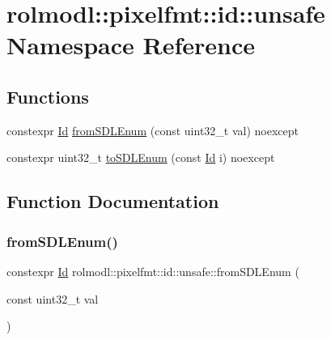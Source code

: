 \hypertarget{namespacerolmodl_1_1pixelfmt_1_1id_1_1unsafe}{}\section{rolmodl\+::pixelfmt\+::id\+::unsafe Namespace Reference}
\label{namespacerolmodl_1_1pixelfmt_1_1id_1_1unsafe}
\subsection*{Functions}
\begin{DoxyCompactItemize}
\item 
constexpr \mbox{\hyperlink{namespacerolmodl_1_1pixelfmt_a96282713e4465ba9211c8fd3a702b52b}{Id}} \mbox{\hyperlink{namespacerolmodl_1_1pixelfmt_1_1id_1_1unsafe_ac815d2437f3f0eeaaf34b8e7a179a593}{from\+S\+D\+L\+Enum}} (const uint32\+\_\+t val) noexcept
\item 
constexpr uint32\+\_\+t \mbox{\hyperlink{namespacerolmodl_1_1pixelfmt_1_1id_1_1unsafe_a0e2c2fca9f1bc5d345511929b84cc97d}{to\+S\+D\+L\+Enum}} (const \mbox{\hyperlink{namespacerolmodl_1_1pixelfmt_a96282713e4465ba9211c8fd3a702b52b}{Id}} i) noexcept
\end{DoxyCompactItemize}


\subsection{Function Documentation}
\mbox{\label{namespacerolmodl_1_1pixelfmt_1_1id_1_1unsafe_ac815d2437f3f0eeaaf34b8e7a179a593}} 
\subsubsection{\texorpdfstring{fromSDLEnum()}{fromSDLEnum()}}
{\footnotesize\ttfamily constexpr \mbox{\hyperlink{namespacerolmodl_1_1pixelfmt_a96282713e4465ba9211c8fd3a702b52b}{Id}} rolmodl\+::pixelfmt\+::id\+::unsafe\+::from\+S\+D\+L\+Enum (\begin{DoxyParamCaption}\item[{const uint32\+\_\+t}]{val }\end{DoxyParamCaption})\hspace{0.3cm}{\ttfamily [noexcept]}}



